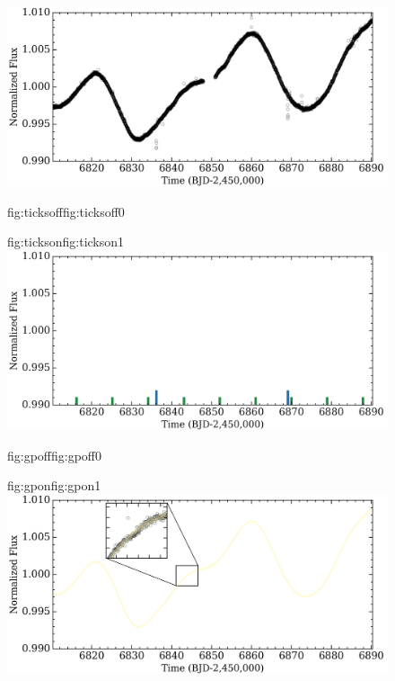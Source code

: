 \begin{figure}
  \centering
  \includegraphics[width=\hsize]{figures/k2phot_bkgd.png}%
   \hspace{-\hsize}%
  \begin{ocg}{fig:ticksoff}{fig:ticksoff}{0}%
  \end{ocg}%
  \begin{ocg}{fig:tickson}{fig:tickson}{1}%
    \includegraphics[width=\hsize]{figures/k2phot_ticks.png}%
  \end{ocg}
  \hspace{-\hsize}%
  \begin{ocg}{fig:gpoff}{fig:gpoff}{0}%
  \end{ocg}%
  \begin{ocg}{fig:gpon}{fig:gpon}{1}%
    \includegraphics[width=\hsize]{figures/k2phot_gp.png}%

\end{ocg}
\end{figure}
